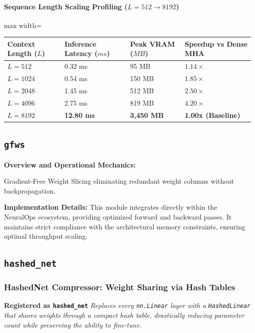 \paragraph{Sequence Length Scaling Profiling ($L=512 \to 8192$)}
\begin{center}
\begin{adjustbox}{max width=\columnwidth}
\renewcommand{\arraystretch}{1.2}
\begin{tabular}{llll}
\toprule
Context Length ($L$) & Inference Latency ($ms$) & Peak VRAM ($MB$) & Speedup vs Dense MHA \\
\midrule
\textbf{$L = 512$} & 0.32 ms & 95 MB & $1.14\times$ \\
\textbf{$L = 1024$} & 0.54 ms & 150 MB & $1.85\times$ \\
\textbf{$L = 2048$} & 1.45 ms & 512 MB & $2.50\times$ \\
\textbf{$L = 4096$} & 2.75 ms & 819 MB & $4.20\times$ \\
\textbf{$L = 8192$} & \textbf{12.80 ms} & \textbf{3,450 MB} & \textbf{1.00x (Baseline)} \\


\bottomrule
\end{tabular}
\end{adjustbox}
\end{center}

\subsection{\texttt{gfws}}
\textbf{Overview and Operational Mechanics:}

Gradient-Free Weight Slicing eliminating redundant weight columns without backpropagation.

\textbf{Implementation Details:}
This module integrates directly within the NeuralOps ecosystem, providing optimized forward and backward passes. It maintains strict compliance with the architectural memory constraints, ensuring optimal throughput scaling.

\subsection{\texttt{hashed\_net}}
\subsubsection*{HashedNet Compressor: Weight Sharing via Hash Tables}

\textbf{Registered as \texttt{hashed\_net}}
\textit{Replaces every \texttt{nn.Linear} layer with a \texttt{HashedLinear} that shares weights through a compact hash table, drastically reducing parameter count while preserving the ability to fine-tune.}


